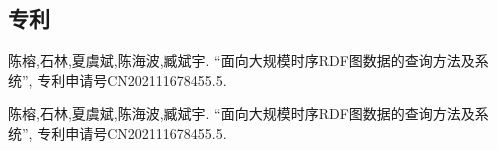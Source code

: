 
\begin{achievements}



\subsection*{专利}

\begin{bibliolist}{00}
  \item 陈榕,石林,夏虞斌,陈海波,臧斌宇. “面向大规模时序RDF图数据的查询方法及系统”, 专利申请号CN202111678455.5.
\end{bibliolist}

\begin{bibliolist*}{00}
  \item 陈榕,石林,夏虞斌,陈海波,臧斌宇. “面向大规模时序RDF图数据的查询方法及系统”, 专利申请号CN202111678455.5.
\end{bibliolist*}

\end{achievements}
